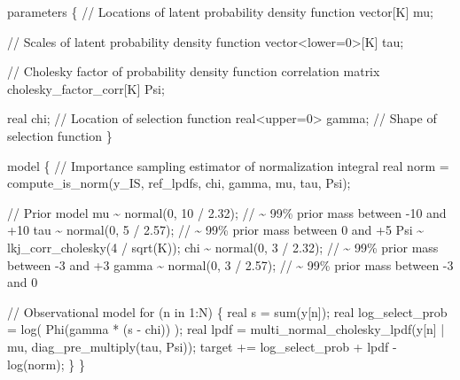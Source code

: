 \documentclass[
  letterpaper,
  DIV=11,
  numbers=noendperiod]{scrartcl}
\newenvironment{Shaded}{\begin{snugshade}}{\end{snugshade}}
\newcommand{\CommentTok}[1]{\textcolor[rgb]{0.37,0.37,0.37}{#1}}
\newcommand{\ControlFlowTok}[1]{\textcolor[rgb]{0.00,0.23,0.31}{#1}}
\newcommand{\DataTypeTok}[1]{\textcolor[rgb]{0.68,0.00,0.00}{#1}}
\newcommand{\DecValTok}[1]{\textcolor[rgb]{0.68,0.00,0.00}{#1}}
\newcommand{\FloatTok}[1]{\textcolor[rgb]{0.68,0.00,0.00}{#1}}
\newcommand{\KeywordTok}[1]{\textcolor[rgb]{0.00,0.23,0.31}{#1}}
\newcommand{\NormalTok}[1]{\textcolor[rgb]{0.00,0.23,0.31}{#1}}
\begin{document}
\begin{codelisting}
\begin{Shaded}
\begin{Highlighting}[]
\KeywordTok{parameters}\NormalTok{ \{}
  \CommentTok{// Locations of latent probability density function}
  \DataTypeTok{vector}\NormalTok{[K] mu;}

  \CommentTok{// Scales of latent probability density function}
  \DataTypeTok{vector}\NormalTok{\textless{}}\KeywordTok{lower}\NormalTok{=}\DecValTok{0}\NormalTok{\textgreater{}[K] tau;}

  \CommentTok{// Cholesky factor of probability density function correlation matrix}
  \DataTypeTok{cholesky\_factor\_corr}\NormalTok{[K] Psi;}

  \DataTypeTok{real}\NormalTok{ chi;            }\CommentTok{// Location of selection function}
  \DataTypeTok{real}\NormalTok{\textless{}}\KeywordTok{upper}\NormalTok{=}\DecValTok{0}\NormalTok{\textgreater{} gamma; }\CommentTok{// Shape of selection function}
\NormalTok{\}}

\KeywordTok{model}\NormalTok{ \{}
  \CommentTok{// Importance sampling estimator of normalization integral}
  \DataTypeTok{real}\NormalTok{ norm = compute\_is\_norm(y\_IS, ref\_lpdfs,}
\NormalTok{                              chi, gamma, mu, tau, Psi);}
  
  \CommentTok{// Prior model}
\NormalTok{  mu \textasciitilde{} normal(}\DecValTok{0}\NormalTok{, }\DecValTok{10}\NormalTok{ / }\FloatTok{2.32}\NormalTok{);   }\CommentTok{// \textasciitilde{} 99\% prior mass between {-}10 and +10}
\NormalTok{  tau \textasciitilde{} normal(}\DecValTok{0}\NormalTok{, }\DecValTok{5}\NormalTok{ / }\FloatTok{2.57}\NormalTok{);   }\CommentTok{// \textasciitilde{} 99\% prior mass between 0 and +5}
\NormalTok{  Psi \textasciitilde{} lkj\_corr\_cholesky(}\DecValTok{4}\NormalTok{ / sqrt(K));}
\NormalTok{  chi \textasciitilde{} normal(}\DecValTok{0}\NormalTok{, }\DecValTok{3}\NormalTok{ / }\FloatTok{2.32}\NormalTok{);   }\CommentTok{// \textasciitilde{} 99\% prior mass between {-}3 and +3}
\NormalTok{  gamma \textasciitilde{} normal(}\DecValTok{0}\NormalTok{, }\DecValTok{3}\NormalTok{ / }\FloatTok{2.57}\NormalTok{); }\CommentTok{// \textasciitilde{} 99\% prior mass between {-}3 and  0}
  
  \CommentTok{// Observational model}
  \ControlFlowTok{for}\NormalTok{ (n }\ControlFlowTok{in} \DecValTok{1}\NormalTok{:N) \{}
    \DataTypeTok{real}\NormalTok{ s = sum(y[n]);}
    \DataTypeTok{real}\NormalTok{ log\_select\_prob = log( Phi(gamma * (s {-} chi)) );}
    \DataTypeTok{real}\NormalTok{ lpdf =}
\NormalTok{      multi\_normal\_cholesky\_lpdf(y[n] | mu, diag\_pre\_multiply(tau, Psi));}
    \KeywordTok{target +=}\NormalTok{ log\_select\_prob + lpdf {-} log(norm);}
\NormalTok{  \}}
\NormalTok{\}}


\end{Highlighting}
\end{Shaded}
\end{codelisting}
\end{document}
